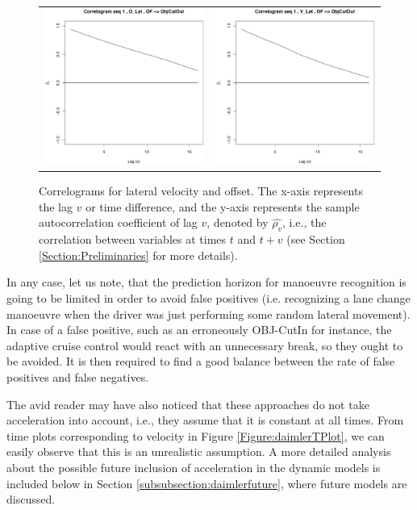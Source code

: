 \begin{figure}[ht!]
  \centering
    \begin{tabular}{cc}
    \includegraphics[width=60mm]{figures/DaimlerCorrOBJ_R15Offs.pdf}&
    \includegraphics[width=60mm]{figures/DaimlerCorrOBJ_R15Vel.pdf}\\
  \end{tabular}
    \caption{\label{Figure:daimlerCorrel}Correlograms for lateral velocity and offset. The x-axis represents the lag $v$ or time difference, and the y-axis represents the sample autocorrelation coefficient of lag $v$, denoted by $\hat{\rho_v}$, i.e., the correlation between variables at times $t$ and $t+v$ (see Section \ref{Section:Preliminaries} for more details).}
\end{figure}

In any case, let us note, that the prediction horizon for manoeuvre recognition is going to be limited in order to avoid false positives (i.e. recognizing a lane change manoeuvre when the driver was just performing some random lateral movement).  In case of a false positive, such as an erroneously OBJ-CutIn for instance, the adaptive cruise control would react with an unnecessary break, so they ought to be avoided. It is then required to find a good balance between the rate of false positives and false negatives. 

The avid reader may have also noticed that these approaches do not take acceleration into account, i.e., they assume that it is constant at all times. From time plots corresponding to velocity in Figure \ref{Figure:daimlerTPlot}, we can easily observe that this is an unrealistic assumption. A more detailed analysis about the possible future inclusion of acceleration in the dynamic models is included below in Section \ref{subsubsection:daimlerfuture}, where future models are discussed.

